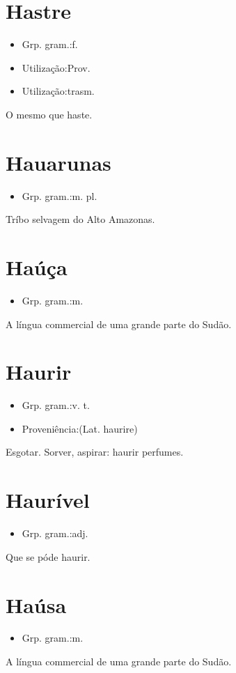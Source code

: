 \documentclass{article}
\begin{document}
\section{Hastre}
\begin{itemize}
\item {Grp. gram.:f.}
\end{itemize}
\begin{itemize}
\item {Utilização:Prov.}
\end{itemize}
\begin{itemize}
\item {Utilização:trasm.}
\end{itemize}
O mesmo que \textunderscore haste\textunderscore .
\section{Hauarunas}
\begin{itemize}
\item {Grp. gram.:m. pl.}
\end{itemize}
Tríbo selvagem do Alto Amazonas.
\section{Haúça}
\begin{itemize}
\item {Grp. gram.:m.}
\end{itemize}
A língua commercial de uma grande parte do Sudão.
\section{Haurir}
\begin{itemize}
\item {Grp. gram.:v. t.}
\end{itemize}
\begin{itemize}
\item {Proveniência:(Lat. \textunderscore haurire\textunderscore )}
\end{itemize}
Esgotar.
Sorver, aspirar: \textunderscore haurir perfumes\textunderscore .
\section{Haurível}
\begin{itemize}
\item {Grp. gram.:adj.}
\end{itemize}
Que se póde haurir.
\section{Haúsa}
\begin{itemize}
\item {Grp. gram.:m.}
\end{itemize}
A língua commercial de uma grande parte do Sudão.
\end{document}
